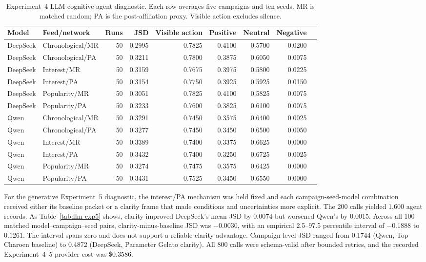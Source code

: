 \documentclass[conference]{IEEEtran}
\begin{document}
\begin{table}[t]
\caption{Experiment~4 LLM cognitive-agent diagnostic. Each row averages five
campaigns and ten seeds. MR is matched random; PA is the post-affiliation
proxy. Visible action excludes silence.}
\label{tab:llm-exp4}
\centering
\scriptsize
\begin{tabular}{@{}llrrrrrrr@{}}
\toprule
Model & Feed/network & Runs & JSD & Visible action & Positive & Neutral & Negative \\
\midrule
DeepSeek & Chronological/MR & 50 & 0.2995 & 0.7825 & 0.4100 & 0.5700 & 0.0200 \\
DeepSeek & Chronological/PA & 50 & 0.3211 & 0.7800 & 0.3875 & 0.6050 & 0.0075 \\
DeepSeek & Interest/MR & 50 & 0.3159 & 0.7675 & 0.3975 & 0.5800 & 0.0225 \\
DeepSeek & Interest/PA & 50 & 0.3154 & 0.7750 & 0.3925 & 0.5925 & 0.0150 \\
DeepSeek & Popularity/MR & 50 & 0.3051 & 0.7825 & 0.4100 & 0.5825 & 0.0075 \\
DeepSeek & Popularity/PA & 50 & 0.3233 & 0.7600 & 0.3825 & 0.6100 & 0.0075 \\
Qwen & Chronological/MR & 50 & 0.3291 & 0.7450 & 0.3575 & 0.6400 & 0.0025 \\
Qwen & Chronological/PA & 50 & 0.3277 & 0.7450 & 0.3450 & 0.6500 & 0.0050 \\
Qwen & Interest/MR & 50 & 0.3389 & 0.7400 & 0.3375 & 0.6625 & 0.0000 \\
Qwen & Interest/PA & 50 & 0.3432 & 0.7400 & 0.3250 & 0.6725 & 0.0025 \\
Qwen & Popularity/MR & 50 & 0.3274 & 0.7475 & 0.3575 & 0.6425 & 0.0000 \\
Qwen & Popularity/PA & 50 & 0.3431 & 0.7525 & 0.3450 & 0.6550 & 0.0000 \\
\bottomrule
\end{tabular}
\end{table}

For the generative Experiment~5 diagnostic, the interest/PA mechanism was held
fixed and each campaign-seed-model combination received either its baseline
packet or a clarity frame that made conditions and uncertainties more explicit.
The 200 calls yielded 1,600 agent records. As Table~\ref{tab:llm-exp5} shows,
clarity improved DeepSeek's mean JSD by 0.0074 but worsened Qwen's by 0.0015.
Across all 100 matched model--campaign--seed pairs, clarity-minus-baseline JSD
was $-0.0030$, with an empirical 2.5--97.5 percentile interval of $-0.1888$ to
$0.1261$. The interval spans zero and does not support a reliable clarity
advantage. Campaign-level JSD ranged from 0.1744 (Qwen, Top Charoen baseline)
to 0.4872 (DeepSeek, Parameter Gelato clarity). All 800 calls were schema-valid
after bounded retries, and the recorded Experiment~4--5 provider cost was
\$0.3586.
\end{document}
